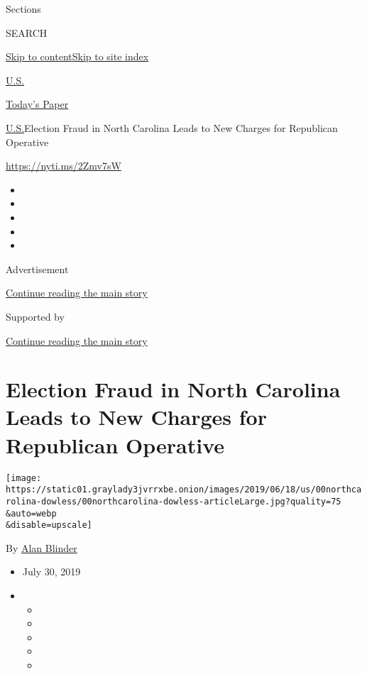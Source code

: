 Sections

SEARCH

\protect\hyperlink{site-content}{Skip to
content}\protect\hyperlink{site-index}{Skip to site index}

\href{https://www.nytimes3xbfgragh.onion/section/us}{U.S.}

\href{https://myaccount.nytimes3xbfgragh.onion/auth/login?response_type=cookie\&client_id=vi}{}

\href{https://www.nytimes3xbfgragh.onion/section/todayspaper}{Today's
Paper}

\href{/section/us}{U.S.}\textbar{}Election Fraud in North Carolina Leads
to New Charges for Republican Operative

\url{https://nyti.ms/2Zmv7sW}

\begin{itemize}
\item
\item
\item
\item
\item
\end{itemize}

Advertisement

\protect\hyperlink{after-top}{Continue reading the main story}

Supported by

\protect\hyperlink{after-sponsor}{Continue reading the main story}

\hypertarget{election-fraud-in-north-carolina-leads-to-new-charges-for-republican-operative}{%
\section{Election Fraud in North Carolina Leads to New Charges for
Republican
Operative}\label{election-fraud-in-north-carolina-leads-to-new-charges-for-republican-operative}}

\texttt{[image: https://static01.graylady3jvrrxbe.onion/images/2019/06/18/us/00northcarolina-dowless/00northcarolina-dowless-articleLarge.jpg?quality=75\\\&auto=webp\\\&disable=upscale]}

By \href{https://www.nytimes3xbfgragh.onion/by/alan-blinder}{Alan
Blinder}

\begin{itemize}
\item
  July 30, 2019
\item
  \begin{itemize}
  \item
  \item
  \item
  \item
  \item
  \end{itemize}
\end{itemize}

